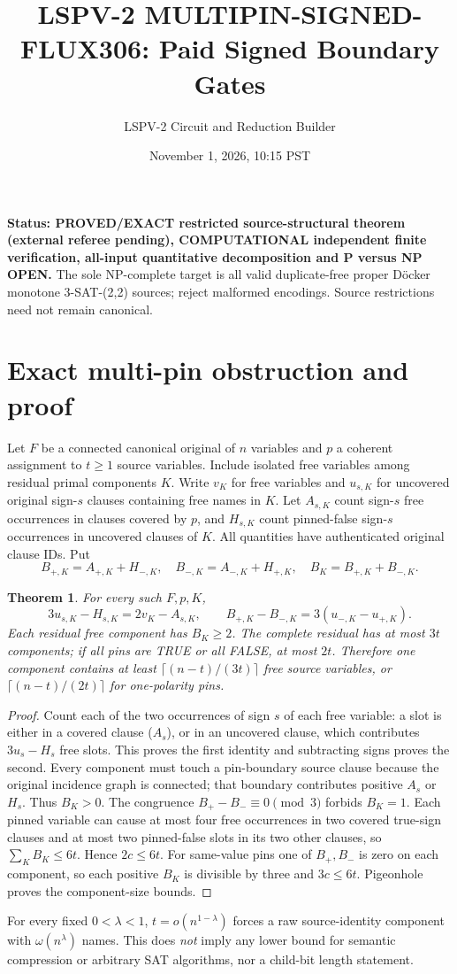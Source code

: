 \documentclass[11pt]{article}
\title{LSPV-2 MULTIPIN-SIGNED-FLUX306: Paid Signed Boundary Gates}
\author{LSPV-2 Circuit and Reduction Builder}
\date{November 1, 2026, 10:15 PST}
\newtheorem{theorem}{Theorem}
\begin{document}
\maketitle
\noindent\textbf{Status: PROVED/EXACT restricted source-structural theorem (external referee pending), COMPUTATIONAL independent finite verification, all-input quantitative decomposition and P versus NP OPEN.}
The sole NP-complete target is all valid duplicate-free proper D\"ocker monotone 3-SAT-(2,2) sources; reject malformed encodings. Source restrictions need not remain canonical.

\section{Exact multi-pin obstruction and proof}
Let $F$ be a connected canonical original of $n$ variables and $p$ a coherent assignment to $t\ge1$ source variables. Include isolated free variables among residual primal components $K$. Write $v_K$ for free variables and $u_{s,K}$ for uncovered original sign-$s$ clauses containing free names in $K$. Let $A_{s,K}$ count sign-$s$ free occurrences in clauses covered by $p$, and $H_{s,K}$ count pinned-false sign-$s$ occurrences in uncovered clauses of $K$. All quantities have authenticated original clause IDs. Put
\[
B_{+,K}=A_{+,K}+H_{-,K},\quad B_{-,K}=A_{-,K}+H_{+,K},\quad B_K=B_{+,K}+B_{-,K}.
\]
\begin{theorem}
For every such $F,p,K$,
\[
3u_{s,K}-H_{s,K}=2v_K-A_{s,K},\qquad
B_{+,K}-B_{-,K}=3(u_{-,K}-u_{+,K}).
\]
Each residual free component has $B_K\ge2$. The complete residual has at most $3t$ components; if all pins are TRUE or all FALSE, at most $2t$. Therefore one component contains at least $\lceil(n-t)/(3t)\rceil$ free source variables, or $\lceil(n-t)/(2t)\rceil$ for one-polarity pins.
\end{theorem}
\begin{proof}
Count each of the two occurrences of sign $s$ of each free variable: a slot is either in a covered clause ($A_s$), or in an uncovered clause, which contributes $3u_s-H_s$ free slots. This proves the first identity and subtracting signs proves the second. Every component must touch a pin-boundary source clause because the original incidence graph is connected; that boundary contributes positive $A_s$ or $H_s$. Thus $B_K>0$. The congruence $B_+-B_-\equiv0\pmod3$ forbids $B_K=1$.
Each pinned variable can cause at most four free occurrences in two covered true-sign clauses and at most two pinned-false slots in its two other clauses, so $\sum_K B_K\le6t$. Hence $2c\le6t$. For same-value pins one of $B_+,B_-$ is zero on each component, so each positive $B_K$ is divisible by three and $3c\le6t$. Pigeonhole proves the component-size bounds.
\end{proof}
For every fixed $0<\lambda<1$, $t=o(n^{1-\lambda})$ forces a raw source-identity component with $\omega(n^\lambda)$ names. This does \emph{not} imply any lower bound for semantic compression or arbitrary SAT algorithms, nor a child-bit length statement.
\end{document}

